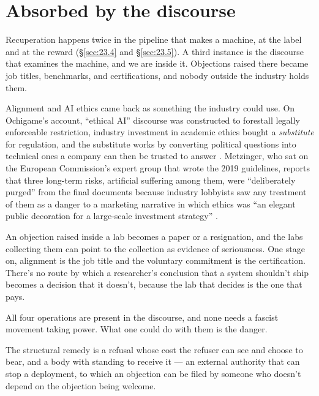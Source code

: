 \section{Absorbed by the discourse}
\label{sec:28.1}
Recuperation happens twice in the pipeline that makes a machine, at the label and at the reward (\S\ref{sec:23.4} and \S\ref{sec:23.5}). A third instance is the discourse that examines the machine, and we are inside it. Objections raised there became job titles, benchmarks, and certifications, and nobody outside the industry holds them.

Alignment and AI ethics came back as something the industry could use. On Ochigame's account, “ethical AI” discourse was constructed to forestall legally enforceable restriction, industry investment in academic ethics bought a \emph{substitute} for regulation, and the substitute works by converting political questions into technical ones a company can then be trusted to answer \autocite{ochigame2019invention}. Metzinger, who sat on the European Commission's expert group that wrote the 2019 guidelines, reports that three long-term risks, artificial suffering among them, were “deliberately purged” from the final documents because industry lobbyists saw any treatment of them as a danger to a marketing narrative in which ethics was “an elegant public decoration for a large-scale investment strategy” \autocite[58–59]{metzinger2021suffering}.


An objection raised inside a lab becomes a paper or a resignation, and the labs collecting them can point to the collection as evidence of seriousness. One stage on, alignment is the job title and the voluntary commitment is the certification.
There's no route by which a researcher's conclusion that a system shouldn't ship becomes a decision that it doesn't, because the lab that decides is the one that pays.

All four operations are present in the discourse, and none needs a fascist movement taking power. What one could do with them is the danger.


The structural remedy is a refusal whose cost the refuser can see and choose to bear, and a body with standing to receive it — an external authority that can stop a deployment, to which an objection can be filed by someone who doesn't depend on the objection being welcome.

